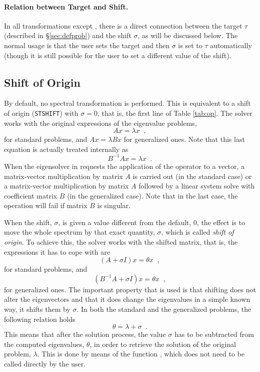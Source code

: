 \paragraph{Relation between Target and Shift.}

	In all transformations except , there is a direct connection between the target $\tau$ (described in \S\ref{sec:defprob}) and the shift $\sigma$, as will be discussed below. The normal usage is that the user sets the target and then $\sigma$ is set to $\tau$ automatically (though it is still possible for the user to set a different value of the shift).

\subsection{Shift of Origin}

	By default, no spectral transformation is performed. This is equivalent to a shift of origin (\texttt{STSHIFT}) with $\sigma=0$, that is, the first line of Table \ref{tab:op}. The solver works with the original expressions of the eigenvalue problems,
\begin{equation}Ax=\lambda x\;\;,\end{equation}
for standard problems, and $Ax=\lambda Bx$ for generalized ones. Note that this last equation is actually treated internally as
\begin{equation}B^{-1}Ax=\lambda x\;\;.\end{equation}
When the eigensolver in  requests the application of the operator to a vector, a matrix-vector multiplication by matrix $A$ is carried out (in the standard case) or a matrix-vector multiplication by matrix $A$ followed by a linear system solve with coefficient matrix $B$ (in the generalized case). Note that in the last case, the operation will fail if matrix $B$ is singular.

When the shift, $\sigma$, is given a value different from the default, 0, the effect is to move the whole spectrum by that exact quantity, $\sigma$, which is called \emph{shift of origin}. To achieve this, the solver works with the shifted matrix, that is, the expressions it has to cope with are
\begin{equation}(A+\sigma I)x=\theta x\;\;,\end{equation}
for standard problems, and 
\begin{equation}(B^{-1}A+\sigma I) x=\theta x\;\;,\end{equation}
for generalized ones. The important property that is used is that shifting does not alter the eigenvectors and that it does change the eigenvalues in a simple known way, it shifts them by $\sigma$. In both the standard and the generalized problems, the following relation holds 
\begin{equation}\theta=\lambda+\sigma\;\;.\end{equation}
This means that after the solution process, the value $\sigma$ has to be subtracted from the computed eigenvalues, $\theta$, in order to retrieve the solution of the original problem, $\lambda$. This is done by means of the function , which does not need to be called directly by the user.

